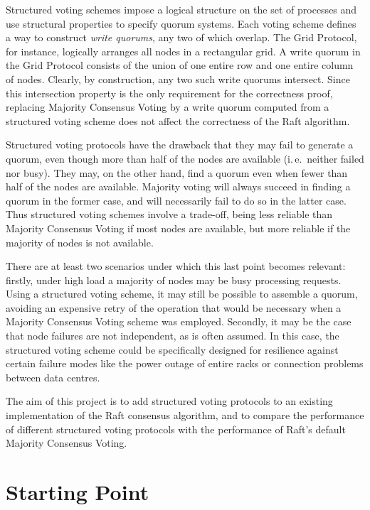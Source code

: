 \documentclass[12pt,chapterprefix=true,toc=bibliography,numbers=noendperiod,
               footnotes=multiple,twoside]{scrreprt}
\begin{document}
Structured voting schemes \autocite{voting} impose a logical structure on the set of processes and use structural properties to specify quorum systems. Each voting scheme defines a way to construct \emph{write quorums}, any two of which overlap. The Grid Protocol, for instance, logically arranges all nodes in a rectangular grid. A write quorum in the Grid Protocol consists of the union of one entire row and one entire column of nodes. Clearly, by construction, any two such write quorums intersect. Since this intersection property is the only requirement for the correctness proof, replacing Majority Consensus Voting by a write quorum computed from a structured voting scheme does not affect the correctness of the Raft algorithm.

Structured voting protocols have the drawback that they may fail to generate a quorum, even though more than half of the nodes are available (i.\,e.\ neither failed nor busy). They may, on the other hand, find a quorum even when fewer than half of the nodes are available. Majority voting will always succeed in finding a quorum in the former case, and will necessarily fail to do so in the latter case. Thus structured voting schemes involve a trade-off, being less reliable than Majority Consensus Voting if most nodes are available, but more reliable if the majority of nodes is not available.

There are at least two scenarios under which this last point becomes relevant: firstly, under high load a majority of nodes may be busy processing requests. Using a structured voting scheme, it may still be possible to assemble a quorum, avoiding an expensive retry of the operation that would be necessary when a Majority Consensus Voting scheme was employed. Secondly, it may be the case that node failures are not independent, as is often assumed. In this case, the structured voting scheme could be specifically designed for resilience against certain failure modes like the power outage of entire racks or connection problems between data centres.

The aim of this project is to add structured voting protocols to an existing implementation of the Raft consensus algorithm, and to compare the performance of different structured voting protocols with the performance of Raft's default Majority Consensus Voting.


\section*{Starting Point%
  \label{starting-point}%
}
%
\end{document}
